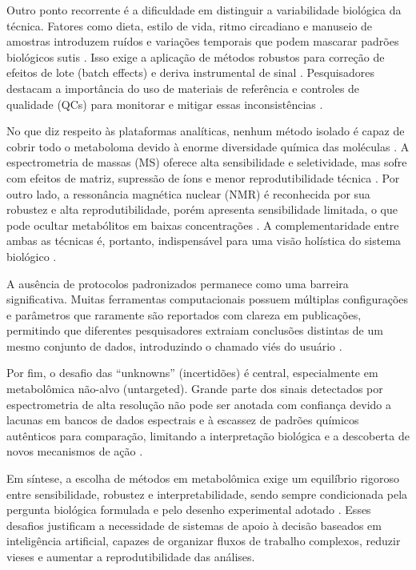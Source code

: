 Outro ponto recorrente é a dificuldade em distinguir a variabilidade biológica da técnica. Fatores como dieta, estilo de vida, ritmo circadiano e manuseio de amostras introduzem ruídos e variações temporais que podem mascarar padrões biológicos sutis \cite{datanor,picone2026integrating}. Isso exige a aplicação de métodos robustos para correção de efeitos de lote (batch effects) e deriva instrumental de sinal \cite{fan2019systematic}. Pesquisadores destacam a importância do uso de materiais de referência e controles de qualidade (QCs) para monitorar e mitigar essas inconsistências \cite{datanor}.

No que diz respeito às plataformas analíticas, nenhum método isolado é capaz de cobrir todo o metaboloma devido à enorme diversidade química das moléculas \cite{wiedmer2013selection}. A espectrometria de massas (MS) oferece alta sensibilidade e seletividade, mas sofre com efeitos de matriz, supressão de íons e menor reprodutibilidade técnica \cite{elmsjo2018method}. Por outro lado, a ressonância magnética nuclear (NMR) é reconhecida por sua robustez e alta reprodutibilidade, porém apresenta sensibilidade limitada, o que pode ocultar metabólitos em baixas concentrações \cite{mayonu2026evaluation}. A complementaridade entre ambas as técnicas é, portanto, indispensável para uma visão holística do sistema biológico \cite{picone2026integrating}.

A ausência de protocolos padronizados permanece como uma barreira significativa. Muitas ferramentas computacionais possuem múltiplas configurações e parâmetros que raramente são reportados com clareza em publicações, permitindo que diferentes pesquisadores extraiam conclusões distintas de um mesmo conjunto de dados, introduzindo o chamado viés do usuário \cite{misra2016updates}.

Por fim, o desafio das “unknowns” (incertidões) é central, especialmente em metabolômica não-alvo (untargeted). Grande parte dos sinais detectados por espectrometria de alta resolução não pode ser anotada com confiança devido a lacunas em bancos de dados espectrais e à escassez de padrões químicos autênticos para comparação, limitando a interpretação biológica e a descoberta de novos mecanismos de ação \cite{picone2026integrating}.

Em síntese, a escolha de métodos em metabolômica exige um equilíbrio rigoroso entre sensibilidade, robustez e interpretabilidade, sendo sempre condicionada pela pergunta biológica formulada e pelo desenho experimental adotado \cite{wiedmer2013selection}. Esses desafios justificam a necessidade de sistemas de apoio à decisão baseados em inteligência artificial, capazes de organizar fluxos de trabalho complexos, reduzir vieses e aumentar a reprodutibilidade das análises.

